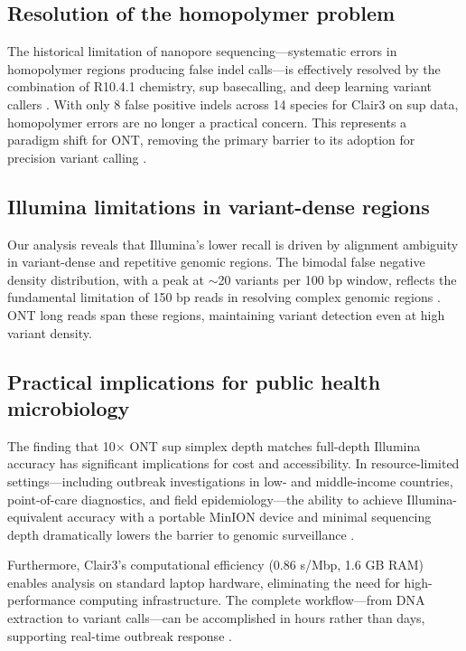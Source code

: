 \documentclass[11pt]{article}
\begin{document}
\subsection{Resolution of the homopolymer problem}

The historical limitation of nanopore sequencing---systematic errors in homopolymer regions producing false indel calls---is effectively resolved by the combination of R10.4.1 chemistry, sup basecalling, and deep learning variant callers \citep{Wick2019}. With only 8 false positive indels across 14 species for Clair3 on sup data, homopolymer errors are no longer a practical concern. This represents a paradigm shift for ONT, removing the primary barrier to its adoption for precision variant calling \citep{Delahaye2021}.

\subsection{Illumina limitations in variant-dense regions}

Our analysis reveals that Illumina's lower recall is driven by alignment ambiguity in variant-dense and repetitive genomic regions. The bimodal false negative density distribution, with a peak at $\sim$20 variants per 100 bp window, reflects the fundamental limitation of 150 bp reads in resolving complex genomic regions \citep{Treangen2012}. ONT long reads span these regions, maintaining variant detection even at high variant density.

\subsection{Practical implications for public health microbiology}

The finding that 10$\times$ ONT sup simplex depth matches full-depth Illumina accuracy has significant implications for cost and accessibility. In resource-limited settings---including outbreak investigations in low- and middle-income countries, point-of-care diagnostics, and field epidemiology---the ability to achieve Illumina-equivalent accuracy with a portable MinION device and minimal sequencing depth dramatically lowers the barrier to genomic surveillance \citep{Quick2016,Faria2017}.

Furthermore, Clair3's computational efficiency (0.86 s/Mbp, 1.6 GB RAM) enables analysis on standard laptop hardware, eliminating the need for high-performance computing infrastructure. The complete workflow---from DNA extraction to variant calls---can be accomplished in hours rather than days, supporting real-time outbreak response \citep{Gardy2018}.
\end{document}
